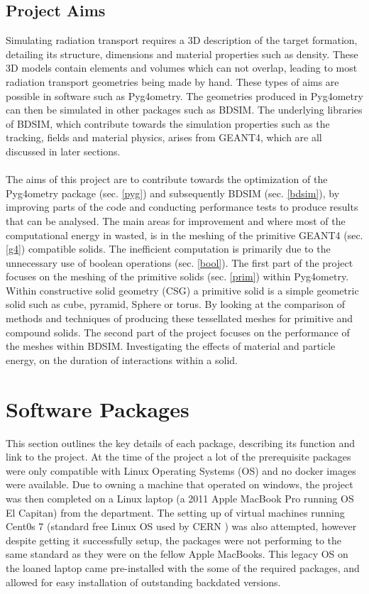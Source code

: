 \documentclass[12pt,a4paper]{article}
\begin{document}
\subsection{Project Aims}
\label{aim}
Simulating radiation transport requires a 3D description of the target formation, detailing its structure, dimensions and material properties such as density. These 3D models contain elements and volumes which can not overlap, leading to most radiation transport geometries being made by hand. These types of aims are possible in software such as Pyg4ometry. The geometries produced in Pyg4ometry can then be simulated in other packages such as BDSIM. The underlying libraries of BDSIM, which contribute towards the simulation properties such as the tracking, fields and material physics, arises from GEANT4, which are all discussed in later sections.
\\\\
\noindent The aims of this project are to contribute towards the optimization of the Pyg4ometry package (sec. \ref{pyg}) and subsequently BDSIM (sec. \ref{bdsim}), by improving parts of the code and conducting performance tests to produce results that can be analysed. The main areas for improvement and where most of the computational energy in wasted, is in the meshing of the primitive GEANT4 (sec. \ref{g4}) compatible solids. The inefficient computation is primarily due to the unnecessary use of boolean operations (sec. \ref{bool}). The first part of the project focuses on the meshing of the primitive solids (sec. \ref{prim}) within Pyg4ometry. Within constructive solid geometry (CSG) a primitive solid is a simple geometric solid such as cube, pyramid, Sphere or torus. By looking at the comparison of methods and techniques of producing these tessellated meshes for primitive and compound solids. The second part of the project focuses on the performance of the meshes within BDSIM. Investigating the effects of material and particle energy, on the duration of interactions within a solid.


\section{Software Packages}
\label{packs}
This section outlines the key details of each package, describing its function and link to the project. At the time of the project a lot of the prerequisite packages were only compatible with Linux Operating Systems (OS) and no docker images were available. Due to owning a machine that operated on windows, the project was then completed on a Linux laptop (a 2011 Apple MacBook Pro running OS El Capitan) from the department. The setting up of virtual machines running Cent0s 7 (standard free Linux OS used by CERN \cite{cern}) was also attempted, however despite getting it successfully setup, the packages were not performing to the same standard as they were on the fellow Apple MacBooks. This legacy OS on the loaned laptop came pre-installed with the some of the required packages, and allowed for easy installation of outstanding backdated versions. 
\end{document}
